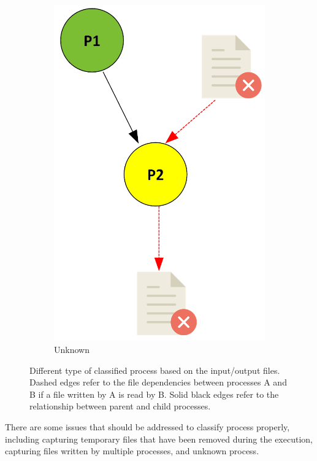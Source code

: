 \documentclass[a4paper,num-refs]{oup-contemporary}
\begin{document}
\begin{figure}
\begin{subfigure}{0.4\linewidth}
    \includegraphics[scale=0.34]{images/yellow.png}
    \caption{Unknown}
    \label{fig:yellow}
\end{subfigure}
    \caption{Different type of classified process based on the input/output files.
  Dashed edges refer to the file dependencies between processes A and B 
  if a file written by A is read by B. Solid black edges refer to the 
  relationship between parent and child processes.}
    \label{fig:processes}
\end{figure}

There are some issues that should be addressed to classify process 
properly, including capturing temporary files that have been removed 
during the execution, capturing files written by multiple processes, 
and unknown process.
\end{document}
